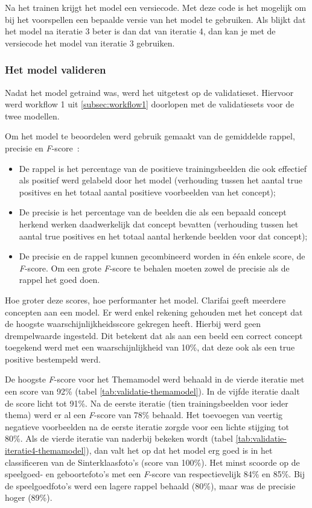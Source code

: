 Na het trainen krijgt het model een versiecode. Met deze code is het mogelijk om bij het voorspellen een bepaalde versie van het model te gebruiken. Als blijkt dat het model na iteratie 3 beter is dan dat van iteratie 4, dan kan je met de versiecode het model van iteratie 3 gebruiken.

\subsubsection{Het model valideren}
\label{subsubsec:model-valideren}

Nadat het model getraind was, werd het uitgetest op de validatieset. Hiervoor werd workflow 1 uit \ref{subsec:workflow1} doorlopen met de validatiesets voor de twee modellen.

Om het model te beoordelen werd gebruik gemaakt van de gemiddelde rappel, precisie en \textit{F}-score~\autocite{Lievens2017}:
\begin{itemize}
    \item De rappel is het percentage van de positieve trainingsbeelden die ook effectief als positief werd gelabeld door het model (verhouding tussen het aantal true positives en het totaal aantal positieve voorbeelden van het concept);
    \item De precisie is het percentage van de beelden die als een bepaald concept herkend werken daadwerkelijk dat concept bevatten (verhouding tussen het aantal true positives en het totaal aantal herkende beelden voor dat concept);
    \item De precisie en de rappel kunnen gecombineerd worden in één enkele score, de \textit{F}-score. Om een grote \textit{F}-score te behalen moeten zowel de precisie als de rappel het goed doen.
\end{itemize}

Hoe groter deze scores, hoe performanter het model. Clarifai geeft meerdere concepten aan een model. Er werd enkel rekening gehouden met het concept dat de hoogste waarschijnlijkheidsscore gekregen heeft. Hierbij werd geen drempelwaarde ingesteld. Dit betekent dat als aan een beeld een correct concept toegekend werd met een waarschijnlijkheid van 10\%, dat deze ook als een true positive bestempeld werd. 

De hoogste \textit{F}-score voor het Themamodel werd behaald in de vierde iteratie met een score van 92\% (tabel \ref{tab:validatie-themamodel}). In de vijfde iteratie daalt de score licht tot 91\%. Na de eerste iteratie (tien trainingsbeelden voor ieder thema) werd er al een \textit{F}-score van 78\% behaald. Het toevoegen van veertig negatieve voorbeelden na de eerste iteratie zorgde voor een lichte stijging tot 80\%. Als de vierde iteratie van naderbij bekeken wordt (tabel \ref{tab:validatie-iteratie4-themamodel}), dan valt het op dat het model erg goed is in het classificeren van de Sinterklaasfoto’s (score van 100\%). Het minst scoorde op de speelgoed- en geboortefoto’s met een \textit{F}-score van respectievelijk 84\% en 85\%. Bij de speelgoedfoto’s werd een lagere rappel behaald (80\%), maar was de precisie hoger (89\%). 

